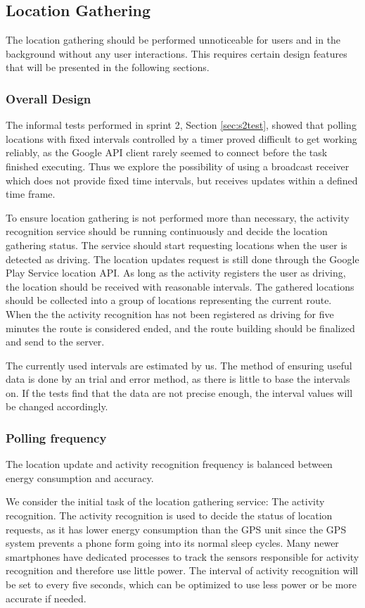 \subsection{Location Gathering}\label{section:s3locgath}
The location gathering should be performed unnoticeable for users and in the background without any user interactions. 
This requires certain design features that will be presented in the following sections. 


\subsubsection{Overall Design}
The informal tests performed in sprint 2, Section \ref{sec:s2test}, showed that polling locations with fixed intervals controlled by a timer proved difficult to get working reliably, as the Google API client rarely seemed to connect before the task finished executing. 
Thus we explore the possibility of using a broadcast receiver which does not provide fixed time intervals, but receives updates within a defined time frame.

To ensure location gathering is not performed more than necessary, the activity recognition service should be running continuously and decide the location gathering status.
The service should start requesting locations when the user is detected as driving. 
The location updates request is still done through the Google Play Service location API.
As long as the activity registers the user as driving, the location should be received with reasonable intervals.
The gathered locations should be collected into a group of locations representing the current route.
When the the activity recognition has not been registered as driving for five minutes the route is considered ended, and the route building should be finalized and send to the server.


The currently used intervals are estimated by us.
The method of ensuring useful data is done by an trial and error method, as there is little to base the intervals on.
If the tests find that the data are not precise enough, the interval values will be changed accordingly.

\subsubsection{Polling frequency}
The location update and activity recognition frequency is balanced between energy consumption and accuracy.

We consider the initial task of the location gathering service: The activity recognition.
The activity recognition is used to decide the status of location requests, as it has lower energy consumption than the GPS unit \cite{fuckGPS} since the GPS system prevents a phone form going into its normal sleep cycles.
Many newer smartphones \cite{coCPU} have dedicated processes to track the sensors responsible for activity recognition and therefore use little power.
The interval of activity recognition will be set to every five seconds, which can be optimized to use less power or be more accurate if needed.

